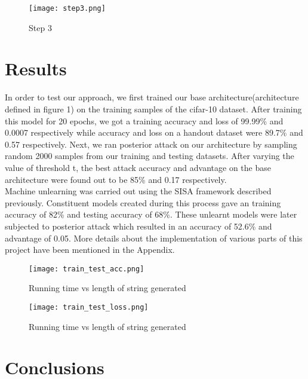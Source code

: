 \documentclass[11pt,letterpaper]{article}
\begin{document}
\begin{figure}[h]
    \centering
    \texttt{[image: step3.png]}
    \caption{Step 3}
    \label{fig:galaxy1}
\end{figure}

\section{Results}



In order to test our approach, we first trained our base architecture(architecture defined in figure 1) on the training samples of the cifar-10 dataset. After training this model for 20 epochs, we got a training accuracy and loss of 99.99\% and 0.0007 respectively while accuracy and loss on a handout dataset were 89.7\% and 0.57 respectively. 
Next, we ran posterior attack on our architecture by sampling random 2000 samples from our training and testing datasets. After varying the value of threshold t, the best attack accuracy and advantage on the base architecture were found out to be 85\% and 0.17 respectively. \\
Machine unlearning was carried out using the SISA framework described previously. Constituent models created during this process gave an training accuracy of 82\% and testing accuracy of 68\%. These unlearnt models were later subjected to posterior attack which resulted in an accuracy of 52.6\% and advantage of 0.05.
More details about the implementation of various parts of this project have been mentioned in the Appendix. 
\begin{figure}[!ht]
        \centering
    \texttt{[image: train\_test\_acc.png]}
\caption{Running time vs length of string generated}
\end{figure}
\begin{figure}[!ht]
        \centering
    \texttt{[image: train\_test\_loss.png]}
\caption{Running time vs length of string generated}
\end{figure}

\section{Conclusions}
\end{document}
